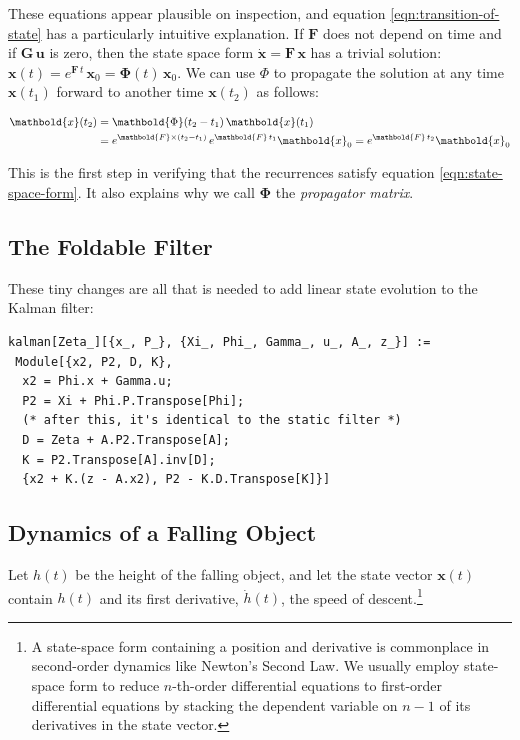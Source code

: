 \documentclass[10pt,oneside,x11names]{article}
\begin{document}
These equations appear plausible on inspection, and equation
\ref{eqn:transition-of-state} has a particularly intuitive explanation. If
\(\mathbold{F}\) does not depend on time and if \(\mathbold{G}\,\mathbold{u}\) is
zero, then the state space form \(\dot{\mathbold{x}}=\mathbold{F}\,\mathbold{x}\)
has a trivial solution:
\(\mathbold{x}(t)=e^{\mathbold{F}\,t}\,\mathbold{x}_0=\mathbold{\Phi}(t)\,\mathbold{x}_0\). We can use \(\Phi\) to
propagate the solution at any time \(\mathbold{x}(t_1)\) forward to another time
\(\mathbold{x}(t_2)\) as follows:

\begin{align}
\mathbold{x}(t_2)&=\mathbold{\Phi}(t_2-t_1)\,\mathbold{x}(t_1) \\
\notag
&=e^{\mathbold{F}\times(t_2-t_1)}\,e^{\mathbold{F}\,t_1}\mathbold{x}_0=e^{\mathbold{F}\,t_2}\mathbold{x}_0
\end{align}

\noindent This is the first step in verifying that the recurrences satisfy
equation \ref{eqn:state-space-form}. It also explains why we call
\(\mathbold{\Phi}\) the \emph{propagator matrix}.

\subsection{The Foldable Filter}
\label{sec:orgheadline5}

These tiny changes are all that is needed to add linear state evolution to the Kalman
filter:

\begin{verbatim}
kalman[Zeta_][{x_, P_}, {Xi_, Phi_, Gamma_, u_, A_, z_}] :=
 Module[{x2, P2, D, K},
  x2 = Phi.x + Gamma.u;
  P2 = Xi + Phi.P.Transpose[Phi];
  (* after this, it's identical to the static filter *)
  D = Zeta + A.P2.Transpose[A];
  K = P2.Transpose[A].inv[D];
  {x2 + K.(z - A.x2), P2 - K.D.Transpose[K]}]\end{verbatim}

\subsection{Dynamics of a Falling Object}
\label{sec:orgheadline6}

Let \(h(t)\) be the height of
the falling object, and let the state vector \(\mathbold{x}(t)\) contain \(h(t)\)
and its first derivative, \(\dot{h}(t)\), the speed of descent.\footnote{A state-space form containing a position and derivative is commonplace
in second-order dynamics like Newton's Second Law. We usually employ state-space
form to reduce \(n\)-th-order differential equations to first-order differential
equations by stacking the dependent variable on \(n-1\) of its derivatives in the
state vector.}
\end{document}
